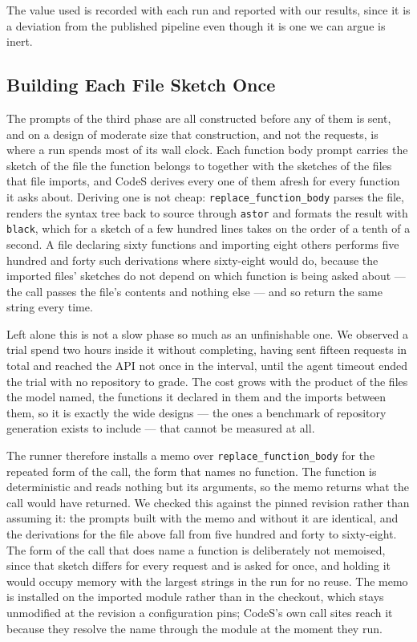 The value used is recorded with each run and reported with our results, since
it is a deviation from the published pipeline even though it is one we can
argue is inert.

\subsection{Building Each File Sketch Once}

The prompts of the third phase are all constructed before any of them is sent,
and on a design of moderate size that construction, and not the requests, is
where a run spends most of its wall clock. Each function body prompt carries
the sketch of the file the function belongs to together with the sketches of
the files that file imports, and CodeS derives every one of them afresh for
every function it asks about. Deriving one is not cheap:
\texttt{replace\_function\_body} parses the file, renders the syntax tree back
to source through \texttt{astor} and formats the result with \texttt{black},
which for a sketch of a few hundred lines takes on the order of a tenth of a
second. A file declaring sixty functions and importing eight others performs
five hundred and forty such derivations where sixty-eight would do, because the
imported files' sketches do not depend on which function is being asked about
--- the call passes the file's contents and nothing else --- and so return the
same string every time.

Left alone this is not a slow phase so much as an unfinishable one. We observed
a trial spend two hours inside it without completing, having sent fifteen
requests in total and reached the API not once in the interval, until the agent
timeout ended the trial with no repository to grade. The cost grows with the
product of the files the model named, the functions it declared in them and the
imports between them, so it is exactly the wide designs --- the ones a
benchmark of repository generation exists to include --- that cannot be
measured at all.

The runner therefore installs a memo over \texttt{replace\_function\_body} for
the repeated form of the call, the form that names no function. The function is
deterministic and reads nothing but its arguments, so the memo returns what the
call would have returned. We checked this against the pinned revision rather
than assuming it: the prompts built with the memo and without it are identical,
and the derivations for the file above fall from five hundred and forty to
sixty-eight. The form of the call that does name a function is deliberately not
memoised, since that sketch differs for every request and is asked for once,
and holding it would occupy memory with the largest strings in the run for no
reuse. The memo is installed on the imported module rather than in the
checkout, which stays unmodified at the revision a configuration pins; CodeS's
own call sites reach it because they resolve the name through the module at the
moment they run.


